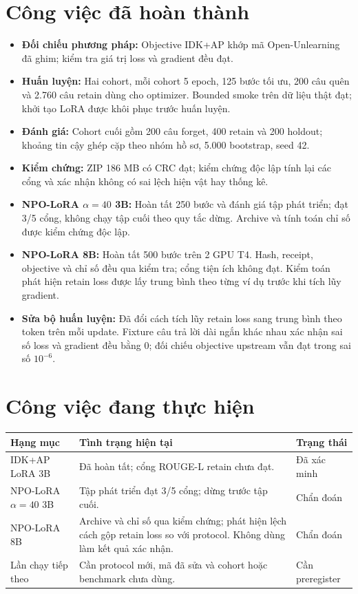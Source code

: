 \documentclass[11pt,a4paper]{article}
\newif\ifshowguide
\newcommand{\guide}[1]{\ifshowguide{\par\small\itshape\color{muted}#1\par\medskip}\fi}
\let\oldsection\section
\renewcommand{\section}{\needspace{6\baselineskip}\oldsection}
\begin{document}
\section{Công việc đã hoàn thành}
\guide{Mỗi công việc ghi một dòng, nêu việc đã làm và kết quả.}
\begin{itemize}
  \item \textbf{Đối chiếu phương pháp:} Objective IDK+AP khớp mã Open-Unlearning đã ghim; kiểm tra giá trị loss và gradient đều đạt.
  \item \textbf{Huấn luyện:} Hai cohort, mỗi cohort 5 epoch, 125 bước tối ưu, 200 câu quên và 2.760 câu retain dùng cho optimizer. Bounded smoke trên dữ liệu thật đạt; khởi tạo LoRA được khôi phục trước huấn luyện.
  \item \textbf{Đánh giá:} Cohort cuối gồm 200 câu forget, 400 retain và 200 holdout; khoảng tin cậy ghép cặp theo nhóm hồ sơ, 5.000 bootstrap, seed 42.
  \item \textbf{Kiểm chứng:} ZIP 186 MB có CRC đạt; kiểm chứng độc lập tính lại các cổng và xác nhận không có sai lệch hiện vật hay thống kê.
  \item \textbf{NPO-LoRA $\alpha=40$ 3B:} Hoàn tất 250 bước và đánh giá tập phát triển; đạt 3/5 cổng, không chạy tập cuối theo quy tắc dừng. Archive và tính toán chỉ số được kiểm chứng độc lập.
  \item \textbf{NPO-LoRA 8B:} Hoàn tất 500 bước trên 2 GPU T4. Hash, receipt, objective và chỉ số đều qua kiểm tra; cổng tiện ích không đạt. Kiểm toán phát hiện retain loss được lấy trung bình theo từng ví dụ trước khi tích lũy gradient.
  \item \textbf{Sửa bộ huấn luyện:} Đã đổi cách tích lũy retain loss sang trung bình theo token trên mỗi update. Fixture câu trả lời dài ngắn khác nhau xác nhận sai số loss và gradient đều bằng 0; đối chiếu objective upstream vẫn đạt trong sai số $10^{-6}$.
\end{itemize}

\section{Công việc đang thực hiện}
\guide{Nêu các công việc đang thực hiện và trạng thái hiện tại.}
\begin{tabularx}{\textwidth}{@{}p{4.3cm}X>{\raggedright\arraybackslash}p{3.2cm}@{}}
\toprule
\textbf{Hạng mục} & \textbf{Tình trạng hiện tại} & \textbf{Trạng thái}\\
\midrule
IDK+AP LoRA 3B & Đã hoàn tất; cổng ROUGE-L retain chưa đạt. & Đã xác minh\\
NPO-LoRA $\alpha=40$ 3B & Tập phát triển đạt 3/5 cổng; dừng trước tập cuối. & Chẩn đoán\\
NPO-LoRA 8B & Archive và chỉ số qua kiểm chứng; phát hiện lệch cách gộp retain loss so với protocol. Không dùng làm kết quả xác nhận. & Chẩn đoán\\
Lần chạy tiếp theo & Cần protocol mới, mã đã sửa và cohort hoặc benchmark chưa dùng. & Cần preregister\\
\bottomrule
\end{tabularx}
\end{document}
